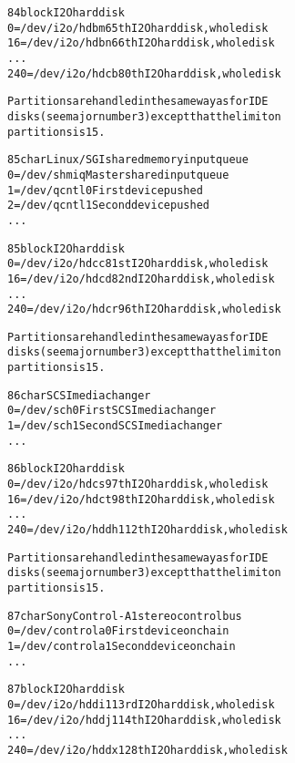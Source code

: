 \documentclass[a4paper,8pt,english]{sphinxmanual}
\begin{document}
\begin{alltt}
  84 block      I2O hard disk
                  0 = /dev/i2o/hdbm     65th I2O hard disk, whole disk
                 16 = /dev/i2o/hdbn     66th I2O hard disk, whole disk
                    ...
                240 = /dev/i2o/hdcb     80th I2O hard disk, whole disk

                Partitions are handled in the same way as for IDE
                disks (see major number 3) except that the limit on
                partitions is 15.

  85 char       Linux/SGI shared memory input queue
                  0 = /dev/shmiq        Master shared input queue
                  1 = /dev/qcntl0       First device pushed
                  2 = /dev/qcntl1       Second device pushed
                    ...

  85 block      I2O hard disk
                  0 = /dev/i2o/hdcc     81st I2O hard disk, whole disk
                 16 = /dev/i2o/hdcd     82nd I2O hard disk, whole disk
                    ...
                240 = /dev/i2o/hdcr     96th I2O hard disk, whole disk

                Partitions are handled in the same way as for IDE
                disks (see major number 3) except that the limit on
                partitions is 15.

  86 char       SCSI media changer
                  0 = /dev/sch0         First SCSI media changer
                  1 = /dev/sch1         Second SCSI media changer
                    ...

  86 block      I2O hard disk
                  0 = /dev/i2o/hdcs     97th I2O hard disk, whole disk
                 16 = /dev/i2o/hdct     98th I2O hard disk, whole disk
                    ...
                240 = /dev/i2o/hddh     112th I2O hard disk, whole disk

                Partitions are handled in the same way as for IDE
                disks (see major number 3) except that the limit on
                partitions is 15.

  87 char       Sony Control-A1 stereo control bus
                  0 = /dev/controla0    First device on chain
                  1 = /dev/controla1    Second device on chain
                    ...

  87 block      I2O hard disk
                  0 = /dev/i2o/hddi     113rd I2O hard disk, whole disk
                 16 = /dev/i2o/hddj     114th I2O hard disk, whole disk
                    ...
                240 = /dev/i2o/hddx     128th I2O hard disk, whole disk


\end{alltt}
\end{document}
